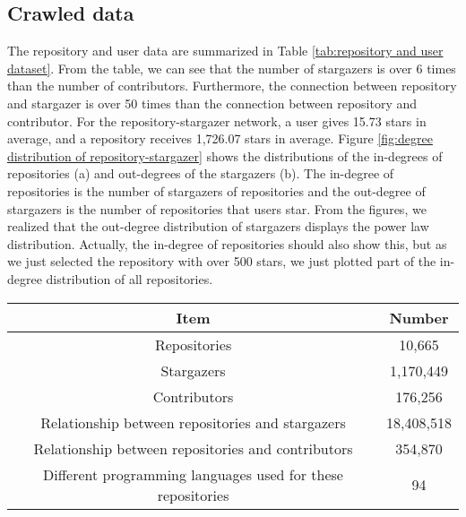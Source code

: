 \documentclass[12pt,oneside,final]{vlsithesis}
\begin{document}
\subsection{Crawled data}
The repository and user data are summarized in Table \ref{tab:repository and user dataset}.  From the table, we can see that the number of stargazers is over 6 times than the number of contributors. Furthermore, the connection between repository and stargazer is over 50 times than the connection between repository and contributor. 
For the repository-stargazer network, a user gives 15.73 stars in average, and a repository receives 1,726.07 stars in average. Figure \ref{fig:degree distribution of repository-stargazer} shows the distributions of the in-degrees of repositories (a) and  out-degrees of the stargazers (b). The in-degree of repositories is the number of stargazers of repositories and the out-degree of stargazers is the number of repositories that users star. From the figures,  we realized that the out-degree distribution of stargazers displays the power law distribution. Actually, the in-degree of repositories should also show this, but as we just selected the repository with over 500 stars, we just plotted part of the in-degree distribution of all repositories.
\begin{table*}
	\centering
	\begin{tabular}{c|c} \toprule
		Item & Number \\ \hline
		Repositories & 10,665 \\ 
		Stargazers &  1,170,449 \\ 
		Contributors & 176,256 \\ 
		Relationship between repositories and stargazers & 18,408,518 \\ 
		Relationship between repositories and contributors & 354,870 \\ 
		Different programming languages used for these repositories & 94 \\ \bottomrule
	\end{tabular}
	\caption{Repository and user dataset}
	\label{tab:repository and user dataset}
\end{table*}

\end{document}
